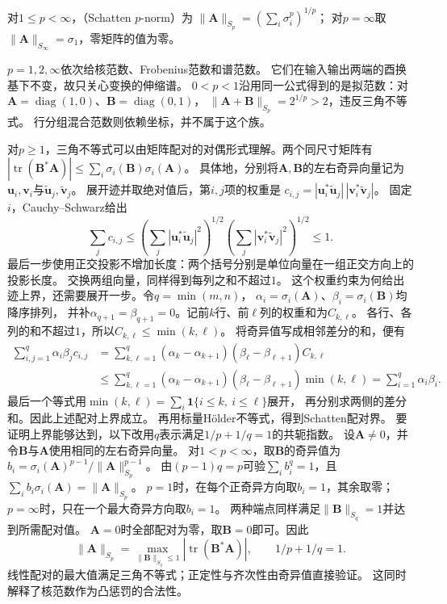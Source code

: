 \begin{definition}[Schatten范数]
\label{def:matrix-analysis-schatten-norm}
对$1\leq p<\infty$，（Schatten $p$-norm）为
$\lVert\bm A\rVert_{S_p}=(\sum_i\sigma_i^p)^{1/p}$；
对$p=\infty$取$\lVert\bm A\rVert_{S_\infty}=\sigma_1$，零矩阵的值为零。
\end{definition}
$p=1,2,\infty$依次给核范数、Frobenius范数和谱范数。
它们在输入输出两端的酉换基下不变，故只关心变换的伸缩谱。
$0<p<1$沿用同一公式得到的是拟范数：对
$\bm A=\operatorname{diag}(1,0)$、$\bm B=\operatorname{diag}(0,1)$，
$\lVert\bm A+\bm B\rVert_{S_p}=2^{1/p}>2$，违反三角不等式。
行分组混合范数则依赖坐标，并不属于这个族。

对$p\geq1$，三角不等式可以由矩阵配对的对偶形式理解。两个同尺寸矩阵有
$|\operatorname{tr}(\bm B^*\bm A)|
\leq\sum_i\sigma_i(\bm B)\sigma_i(\bm A)$。
具体地，分别将$\bm A,\bm B$的左右奇异向量记为
$\bm u_i,\bm v_i$与$\widetilde{\bm u}_j,\widetilde{\bm v}_j$。
展开迹并取绝对值后，第$i,j$项的权重是
$c_{i,j}=|\bm u_i^*\widetilde{\bm u}_j|\,|\bm v_i^*\widetilde{\bm v}_j|$。
固定$i$，Cauchy--Schwarz给出
\[
 \sum_jc_{i,j}\leq
 \left(\sum_j|\bm u_i^*\widetilde{\bm u}_j|^2\right)^{1/2}
 \left(\sum_j|\bm v_i^*\widetilde{\bm v}_j|^2\right)^{1/2}\leq1.
\]
最后一步使用正交投影不增加长度：两个括号分别是单位向量在一组正交方向上的投影长度。
交换两组向量，同样得到每列之和不超过$1$。
这个权重约束为何给出迹上界，还需要展开一步。令$q=\min(m,n)$，
$\alpha_i=\sigma_i(\bm A)$、$\beta_i=\sigma_i(\bm B)$均降序排列，
并补$\alpha_{q+1}=\beta_{q+1}=0$。记前$k$行、前$\ell$列的权重和为$C_{k,\ell}$。
各行、各列的和不超过$1$，所以$C_{k,\ell}\leq\min(k,\ell)$。
将奇异值写成相邻差分的和，便有
\[
 \begin{aligned}
 \sum_{i,j=1}^q\alpha_i\beta_jc_{i,j}
 &=\sum_{k,\ell=1}^q(\alpha_k-\alpha_{k+1})
                      (\beta_\ell-\beta_{\ell+1})C_{k,\ell}\\
 &\leq\sum_{k,\ell=1}^q(\alpha_k-\alpha_{k+1})
                      (\beta_\ell-\beta_{\ell+1})\min(k,\ell)
 =\sum_{i=1}^q\alpha_i\beta_i.
 \end{aligned}
\]
最后一个等式用$\min(k,\ell)=\sum_i\mathbf1\{i\leq k,\ i\leq\ell\}$展开，
再分别求两侧的差分和。因此上述配对上界成立。
再用标量Hölder不等式，得到Schatten配对界。
要证明上界能够达到，以下改用$q$表示满足$1/p+1/q=1$的共轭指数。
设$\bm A\neq0$，并令$\bm B$与$\bm A$使用相同的左右奇异向量。
对$1<p<\infty$，取$\bm B$的奇异值为
$b_i=\sigma_i(\bm A)^{p-1}/\lVert\bm A\rVert_{S_p}^{p-1}$。
由$(p-1)q=p$可验$\sum_i b_i^q=1$，且
$\sum_i b_i\sigma_i(\bm A)=\lVert\bm A\rVert_{S_p}$。
$p=1$时，在每个正奇异方向取$b_i=1$，其余取零；$p=\infty$时，只在一个最大奇异方向取$b_i=1$。
两种端点同样满足$\lVert\bm B\rVert_{S_q}=1$并达到所需配对值。
$\bm A=0$时全部配对为零，取$\bm B=0$即可。因此
\[
 \lVert\bm A\rVert_{S_p}
 =\max_{\lVert\bm B\rVert_{S_q}\leq1}
       |\operatorname{tr}(\bm B^*\bm A)|,\qquad 1/p+1/q=1.
\]
线性配对的最大值满足三角不等式；正定性与齐次性由奇异值直接验证。
这同时解释了核范数作为凸惩罚的合法性。

